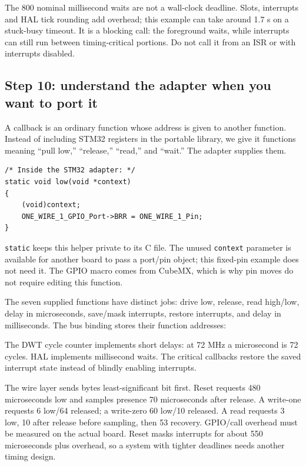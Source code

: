The 800 nominal millisecond waits are not a wall-clock deadline. Slots, interrupts and HAL tick rounding add overhead; this example can take around 1.7 s on a stuck-busy timeout. It is a blocking call: the foreground waits, while interrupts can still run between timing-critical portions. Do not call it from an ISR or with interrupts disabled.

\subsection{Step 10: understand the adapter when you want to port it}
A callback is an ordinary function whose address is given to another function. Instead of including STM32 registers in the portable library, we give it functions meaning ``pull low,'' ``release,'' ``read,'' and ``wait.'' The adapter supplies them.
\begin{lstlisting}
/* Inside the STM32 adapter: */
static void low(void *context)
{
    (void)context;
    ONE_WIRE_1_GPIO_Port->BRR = ONE_WIRE_1_Pin;
}
\end{lstlisting}
\texttt{static} keeps this helper private to its C file. The unused \texttt{context} parameter is available for another board to pass a port/pin object; this fixed-pin example does not need it. The GPIO macro comes from CubeMX, which is why pin moves do not require editing this function.

The seven supplied functions have distinct jobs: drive low, release, read high/low, delay in microseconds, save/mask interrupts, restore interrupts, and delay in milliseconds. The bus binding stores their function addresses:
\par\noindent\begin{minipage}{\linewidth}

\end{minipage}\par
The DWT cycle counter implements short delays: at 72 MHz a microsecond is 72 cycles. HAL implements millisecond waits. The critical callbacks restore the saved interrupt state instead of blindly enabling interrupts.

The wire layer sends bytes least-significant bit first. Reset requests 480 microseconds low and samples presence 70 microseconds after release. A write-one requests 6 low/64 released; a write-zero 60 low/10 released. A read requests 3 low, 10 after release before sampling, then 53 recovery. GPIO/call overhead must be measured on the actual board. Reset masks interrupts for about 550 microseconds plus overhead, so a system with tighter deadlines needs another timing design.

